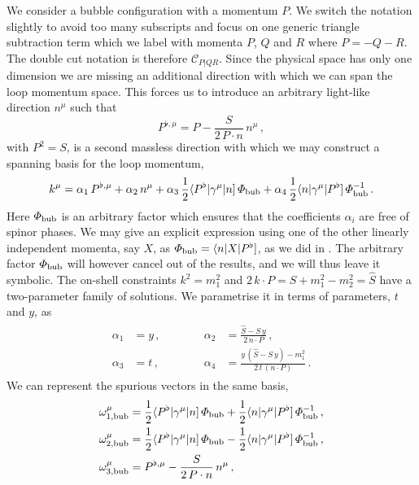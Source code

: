 We consider a bubble configuration with a momentum $P$. We switch the notation
slightly to avoid too many subscripts and focus on one generic triangle
subtraction term which we label with momenta $P$, $Q$ and $R$ where $P = -Q-R$. The double cut
notation is therefore $\mathcal{C}_{P|QR}$.  Since the physical space has only
one dimension we are missing an additional direction with which we can span the
loop momentum space. This forces us to introduce an arbitrary light-like
direction $n^\mu$ such that
\begin{equation}
  P^{\flat,\mu} = P - \frac{S}{2 \, P\cdot n} \, n^\mu \,,
  \label{eq:Pflatdef}
\end{equation}
with $P^2 = S$, is a second massless direction with which we may construct a spanning basis for the loop momentum,
\begin{equation} \label{eq:kPn}
  k^\mu = \alpha_1 \, P^{\flat,\mu} + \alpha_2 \, n^\mu
  + \alpha_3 \, \frac{1}{2}\spAB{P^\flat}{\gamma^\mu}{n} \, \Phi_{\rm bub} + \alpha_4 \, \frac{1}{2}\spAB{n}{\gamma^\mu}{P^\flat} \, \Phi_{\rm bub}^{-1} \,.
\end{equation}
Here $\Phi_{\rm bub}$ is an arbitrary factor which ensures that the coefficients $\alpha_i$ are free of spinor phases. We may give an explicit expression using one of the other linearly independent momenta, say $X$, as $\Phi_{\rm bub}=\spAB{n}{X}{P^{\flat}}$, as we did in . The arbitrary factor $\Phi_{\rm bub}$ will however cancel out of the results, and we will thus leave it symbolic.
The on-shell constraints $k^2 = m_1^2$ and $2\,k \cdot P = S + m_1^2 - m_2^2 = \hat{S}$
have a two-parameter family of solutions. We parametrise it in terms of
parameters, $t$ and $y$, as
\begin{align}
\begin{aligned}
  \alpha_1 &= y \,, \qquad \quad &
  \alpha_2 &= \frac{\hat{S}- S \, y}{2 \, n \cdot P} \,, \\
  \alpha_3 &= t \,, &
  \alpha_4 &= \frac{y \, (\hat{S} - S \, y) - m_1^2}{2 \, t \, (n\cdot P)} \,.
\end{aligned}
  \label{eq:dblcutonshelsol}
\end{align}
We can represent the spurious vectors in the same basis,
\begin{align} \label{eq:spurious_omega_bubble}
  \omega_{1,{\rm bub}}^\mu &= \frac{1}{2}\spAB{P^\flat}{\gamma^\mu}{n} \, \Phi_{\rm bub} + \frac{1}{2}\spAB{n}{\gamma^\mu}{P^\flat} \, \Phi_{\rm bub}^{-1} \,, \\ 
  \omega_{2,{\rm bub}}^\mu &= \frac{1}{2}\spAB{P^\flat}{\gamma^\mu}{n} \, \Phi_{\rm bub} - \frac{1}{2}\spAB{n}{\gamma^\mu}{P^\flat} \, \Phi_{\rm bub}^{-1} \,,\\
  \omega_{3,{\rm bub}}^\mu &= P^{\flat,\mu} - \frac{S}{2 \, P\cdot n} \, n^\mu \,,
\end{align}
